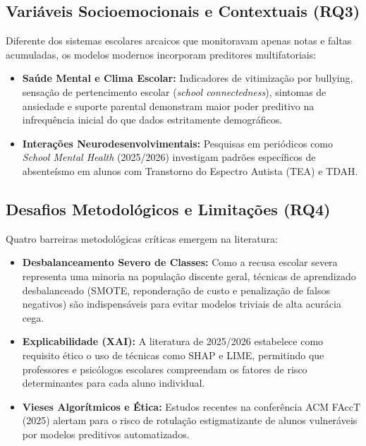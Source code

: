 \documentclass[journal,10pt,a4paper]{IEEEtran}
\begin{document}
\subsection{Variáveis Socioemocionais e Contextuais (RQ3)}
Diferente dos sistemas escolares arcaicos que monitoravam apenas notas e faltas acumuladas, os modelos modernos incorporam preditores multifatoriais:
\begin{itemize}
    \item \textbf{Saúde Mental e Clima Escolar:} Indicadores de vitimização por bullying, sensação de pertencimento escolar (\textit{school connectedness}), sintomas de ansiedade e suporte parental demonstram maior poder preditivo na infrequência inicial do que dados estritamente demográficos.
    \item \textbf{Interações Neurodesenvolvimentais:} Pesquisas em periódicos como \textit{School Mental Health} (2025/2026) investigam padrões específicos de absenteísmo em alunos com Transtorno do Espectro Autista (TEA) e TDAH.
\end{itemize}

\subsection{Desafios Metodológicos e Limitações (RQ4)}
Quatro barreiras metodológicas críticas emergem na literatura:
\begin{itemize}
    \item \textbf{Desbalanceamento Severo de Classes:} Como a recusa escolar severa representa uma minoria na população discente geral, técnicas de aprendizado desbalanceado (SMOTE, reponderação de custo e penalização de falsos negativos) são indispensáveis para evitar modelos triviais de alta acurácia cega.
    \item \textbf{Explicabilidade (XAI):} A literatura de 2025/2026 estabelece como requisito ético o uso de técnicas como SHAP e LIME, permitindo que professores e psicólogos escolares compreendam os fatores de risco determinantes para cada aluno individual.
    \item \textbf{Vieses Algorítmicos e Ética:} Estudos recentes na conferência ACM FAccT (2025) alertam para o risco de rotulação estigmatizante de alunos vulneráveis por modelos preditivos automatizados.
\end{itemize}
\end{document}
